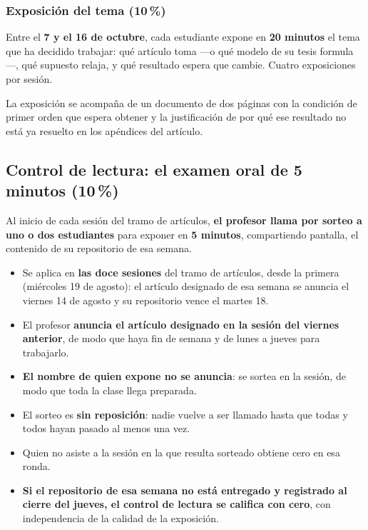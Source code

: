 \documentclass[11pt]{article}
\begin{document}
\subsubsection*{Exposici\'on del tema (10\,\%)}

Entre el \textbf{7 y el 16 de octubre}, cada estudiante expone en \textbf{20 minutos} el tema que ha decidido trabajar: qu\'e art\'iculo toma ---o qu\'e modelo de su tesis formula---, qu\'e supuesto relaja, y qu\'e resultado espera que cambie. Cuatro exposiciones por sesi\'on.

La exposici\'on se acompa\~na de un documento de dos p\'aginas con la condici\'on de primer orden que espera obtener y la justificaci\'on de por qu\'e ese resultado no est\'a ya resuelto en los ap\'endices del art\'iculo.

\subsection*{Control de lectura: el examen oral de 5 minutos (10\,\%)}

Al inicio de cada sesi\'on del tramo de art\'iculos, \textbf{el profesor llama por sorteo a uno o dos estudiantes} para exponer en \textbf{5 minutos}, compartiendo pantalla, el contenido de su repositorio de esa semana.

\begin{itemize}
\item Se aplica en \textbf{las doce sesiones} del tramo de art\'iculos, desde la primera (mi\'ercoles 19 de agosto): el art\'iculo designado de esa semana se anuncia el viernes 14 de agosto y su repositorio vence el martes 18.
\item El profesor \textbf{anuncia el art\'iculo designado en la sesi\'on del viernes anterior}, de modo que haya fin de semana y de lunes a jueves para trabajarlo.
\item \textbf{El nombre de quien expone no se anuncia}: se sortea en la sesi\'on, de modo que toda la clase llega preparada.
\item El sorteo es \textbf{sin reposici\'on}: nadie vuelve a ser llamado hasta que todas y todos hayan pasado al menos una vez.
\item Quien no asiste a la sesi\'on en la que resulta sorteado obtiene cero en esa ronda.
\item \textbf{Si el repositorio de esa semana no est\'a entregado y registrado al cierre del jueves, el control de lectura se califica con cero}, con independencia de la calidad de la exposici\'on.
\end{itemize}
\end{document}
